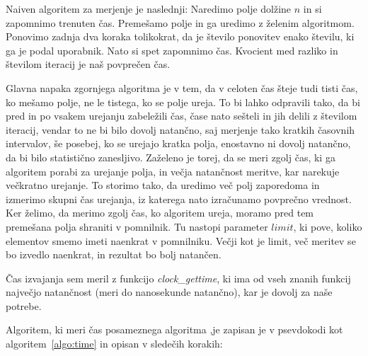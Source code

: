 \documentclass[a4paper,oneside,12pt]{article}
\begin{document}
Naiven algoritem za merjenje je naslednji:                                 
Naredimo polje dolžine $n$ in si zapomnimo trenuten čas. Premešamo polje in ga
uredimo z želenim algoritmom. Ponovimo zadnja dva koraka tolikokrat, da je število
ponovitev enako številu, ki ga je podal uporabnik. Nato si spet zapomnimo čas. Kvocient
med razliko in številom iteracij je naš povprečen čas.

Glavna napaka zgornjega algoritma je v tem, da v celoten čas šteje tudi tisti čas, ko
mešamo polje, ne le tistega, ko se polje ureja. To bi lahko odpravili tako, da bi pred
in po vsakem urejanju zabeležili čas, čase nato sešteli in jih delili z številom iteracij,
vendar to ne bi bilo dovolj natančno, saj merjenje tako kratkih časovnih intervalov,
še posebej, ko se urejajo kratka polja, enostavno ni dovolj natančno, da bi bilo
statistično zanesljivo. Zaželeno je torej, da se meri zgolj čas, ki ga algoritem porabi za
urejanje polja, in večja natančnost meritve, kar narekuje večkratno urejanje. To storimo
tako, da uredimo več polj zaporedoma in izmerimo skupni čas urejanja, iz katerega nato
izračunamo povprečno
vrednost. Ker želimo, da merimo zgolj čas, ko algoritem ureja, moramo pred tem 
premešana polja shraniti v pomnilnik. Tu nastopi parameter $limit$, ki pove, koliko
elementov smemo imeti naenkrat v pomnilniku. Večji kot je limit, več meritev se bo izvedlo naenkrat,
in rezultat bo bolj natančen.

Čas izvajanja sem meril z funkcijo \emph{clock\_gettime}, ki ima od vseh znanih
funkcij največjo natančnost (meri do nanosekunde natančno), kar je dovolj
za naše potrebe.

Algoritem, ki meri čas posameznega algoritma ,je zapisan je v psevdokodi kot
algoritem~\ref{algo:time} in opisan v sledečih korakih:
\end{document}
